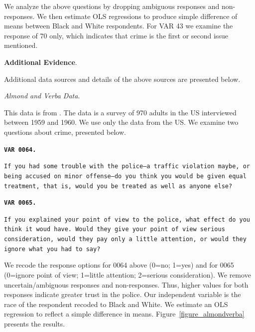 \documentclass[12pt]{article}
\newenvironment{shift}{\begin{adjustwidth}{1cm}{}}{\end{adjustwidth}}
\begin{document}
	 \vspace{.1in}


We analyze the above questions by dropping ambiguous responses and non-responses.  We then estimate OLS regressions to produce simple difference of means between Black and White respondents.  For VAR 43 we examine the response of 70 only, which indicates that crime is the first or second issue mentioned.


\vspace{.25in}
\textbf{Additional Evidence}.


Additional data sources and details of the above sources are presented below.

\vspace{.25in}
\emph{Almond and Verba Data}.

This data is from . The data is a survey of 970 adults in the US interviewed between 1959 and 1960.  We use only the data from the US.  We examine two questions about crime, presented below.


\vspace{.1in}
\begin{shift}

	\texttt{\textbf{VAR 0064.}}

	\texttt{If you had some trouble with the police--a traffic violation maybe, or being accused on minor offense--do you think you would be given equal treatment, that is, would 	you be treated as well as anyone else?}

	\vspace{.05in}
	\texttt{\textbf{VAR 0065.}}

	\texttt{If you explained your point of view to the police, what effect do you think it woud have.  Would they give your point of view serious consideration, would they pay only a little attention, or would they ignore what you had to say?}
\end{shift}
\vspace{.1in}

We recode the response options for 0064 above (0=no; 1=yes) and for 0065 (0=ignore point of view; 1=little attention; 2=serious consideration). We remove uncertain/ambiguous responses and non-responses. Thus, higher values for both responses indicate greater trust in the police.  Our independent variable is the race of the respondent recoded to Black and White.  We estimate an OLS regression to reflect a simple difference in means.  Figure~\ref{figure_almondverba} presents the results.
\end{document}
